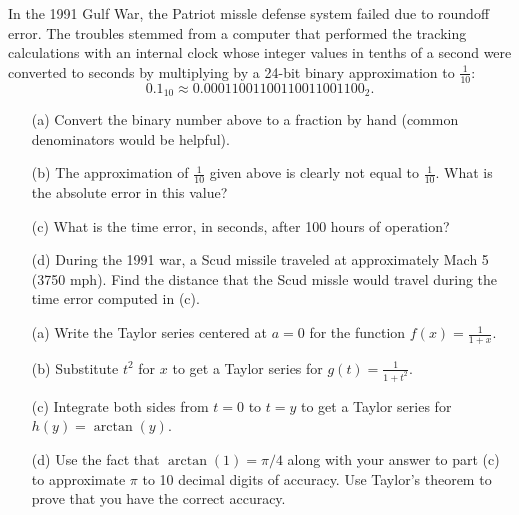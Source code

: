 \begin{problem}
    In the 1991 Gulf War, the Patriot missle defense system failed due to roundoff error.
    The troubles stemmed from a computer that performed the tracking calculations with an
    internal clock whose integer values in tenths of a second were converted to seconds by
    multiplying by a 24-bit binary approximation to $\frac{1}{10}$:
    \[ 0.1_{10} \approx 0.00011001100110011001100_2. \]
    \begin{enumerate}
        \item[(a)] Convert the binary number above to a fraction by hand (common
            denominators would be helpful).
        \item[(b)] The approximation of $\frac{1}{10}$ given above is clearly not equal to
            $\frac{1}{10}$.  What is the absolute error in this value?
        \item[(c)] What is the time error, in seconds, after 100 hours of operation?
        \item[(d)] During the 1991 war, a Scud missile traveled at approximately Mach 5
            (3750 mph).  Find the distance that the Scud missle would travel during the
            time error computed in (c).
    \end{enumerate}
\end{problem}


\begin{problem}
    \begin{enumerate}
        \item[(a)] Write the Taylor series centered at $a=0$ for the function $f(x) =
            \frac{1}{1+x}$.
        \item[(b)] Substitute $t^2$ for $x$ to get a Taylor series for $g(t) =
            \frac{1}{1+t^2}$.
        \item[(c)] Integrate both sides from $t=0$ to $t=y$ to get a Taylor series for
            $h(y) = \arctan(y)$.
        \item[(d)] Use the fact that $\arctan(1) = \pi/4$ along with your answer
            to part (c) to approximate $\pi$ to 10 decimal digits of accuracy.  Use
            Taylor's theorem to prove that you have the correct accuracy.
    \end{enumerate}
\end{problem}


